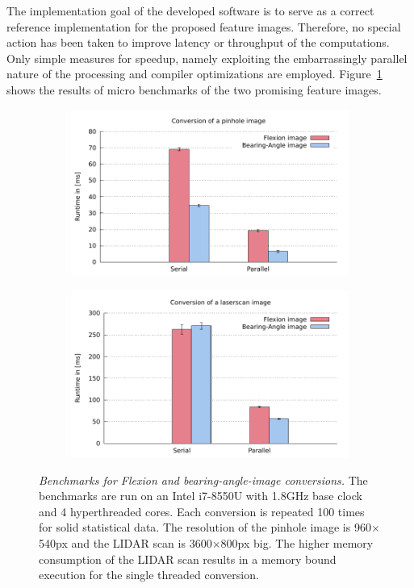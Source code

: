 The implementation goal of the developed software is to serve as a correct reference implementation for the proposed feature images.
Therefore, no special action has been taken to improve latency or throughput of the computations.
Only simple measures for speedup, namely exploiting the embarrassingly parallel nature of the processing and compiler optimizations are employed.
Figure~\ref{fig:benchmarks} shows the results of micro benchmarks of the two promising feature images.
\begin{figure}
\centering
    \begin{subfigure}[b]{0.45\linewidth}
        \includegraphics[width=\linewidth]{chapter06/results/benchmarks/pinhole_benchmarks.pdf}
    \end{subfigure}\quad
    \begin{subfigure}[b]{0.45\linewidth}
        \includegraphics[width=\linewidth]{chapter06/results/benchmarks/laserscan_benchmarks.pdf}
    \end{subfigure}
    \caption[Benchmarks for Flexion and \gls{bearing-angle-image} conversions]{\emph{Benchmarks for Flexion and \gls{bearing-angle-image} conversions.} The benchmarks are run on an Intel i7-8550U with 1.8GHz base clock and 4 hyperthreaded cores. Each conversion is repeated 100 times for solid statistical data. The resolution of the pinhole image is 960$\times$540px and the \acrshort{LIDAR} scan is 3600$\times$800px big. The higher memory consumption of the \acrshort{LIDAR} scan results in a memory bound execution for the single threaded conversion.}\label{fig:benchmarks}
\end{figure}
